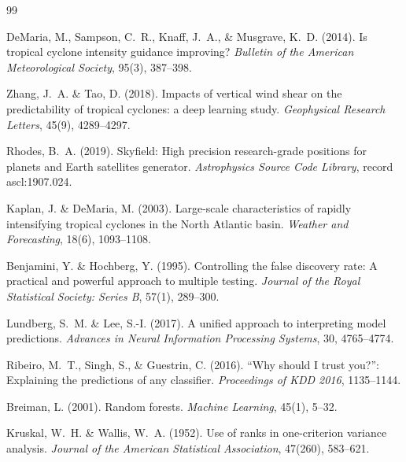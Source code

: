 \documentclass[12pt,a4paper]{article}
\begin{document}
    
    \begin{thebibliography}{99}

    DeMaria, M., Sampson, C.~R., Knaff, J.~A., \& Musgrave, K.~D. (2014).
    Is tropical cyclone intensity guidance improving?
    \textit{Bulletin of the American Meteorological Society}, 95(3), 387--398.

    Zhang, J.~A. \& Tao, D. (2018).
    Impacts of vertical wind shear on the predictability of tropical cyclones:
    a deep learning study.
    \textit{Geophysical Research Letters}, 45(9), 4289--4297.

    Rhodes, B.~A. (2019).
    Skyfield: High precision research-grade positions for planets and Earth
    satellites generator.
    \textit{Astrophysics Source Code Library}, record ascl:1907.024.

    Kaplan, J. \& DeMaria, M. (2003).
    Large-scale characteristics of rapidly intensifying tropical cyclones in the
    North Atlantic basin.
    \textit{Weather and Forecasting}, 18(6), 1093--1108.

    Benjamini, Y. \& Hochberg, Y. (1995).
    Controlling the false discovery rate: A practical and powerful approach to
    multiple testing.
    \textit{Journal of the Royal Statistical Society: Series B}, 57(1), 289--300.

    Lundberg, S.~M. \& Lee, S.-I. (2017).
    A unified approach to interpreting model predictions.
    \textit{Advances in Neural Information Processing Systems}, 30, 4765--4774.

    Ribeiro, M.~T., Singh, S., \& Guestrin, C. (2016).
    ``Why should I trust you?'': Explaining the predictions of any classifier.
    \textit{Proceedings of KDD 2016}, 1135--1144.

    Breiman, L. (2001).
    Random forests.
    \textit{Machine Learning}, 45(1), 5--32.

    Kruskal, W.~H. \& Wallis, W.~A. (1952).
    Use of ranks in one-criterion variance analysis.
    \textit{Journal of the American Statistical Association}, 47(260), 583--621.


\end{thebibliography}
\end{document}
